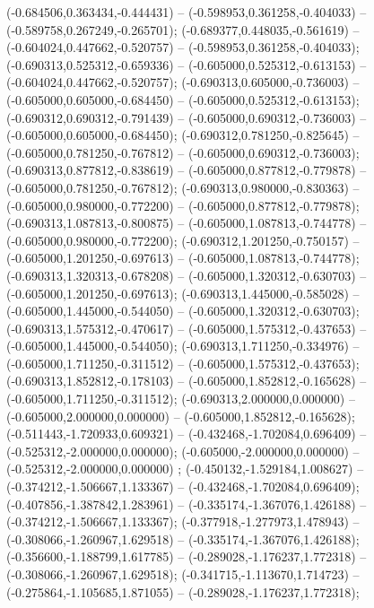  (-0.684506,0.363434,-0.444431) -- (-0.598953,0.361258,-0.404033) -- (-0.589758,0.267249,-0.265701);
 (-0.689377,0.448035,-0.561619) -- (-0.604024,0.447662,-0.520757) -- (-0.598953,0.361258,-0.404033);
 (-0.690313,0.525312,-0.659336) -- (-0.605000,0.525312,-0.613153) -- (-0.604024,0.447662,-0.520757);
 (-0.690313,0.605000,-0.736003) -- (-0.605000,0.605000,-0.684450) -- (-0.605000,0.525312,-0.613153);
 (-0.690312,0.690312,-0.791439) -- (-0.605000,0.690312,-0.736003) -- (-0.605000,0.605000,-0.684450);
 (-0.690312,0.781250,-0.825645) -- (-0.605000,0.781250,-0.767812) -- (-0.605000,0.690312,-0.736003);
 (-0.690313,0.877812,-0.838619) -- (-0.605000,0.877812,-0.779878) -- (-0.605000,0.781250,-0.767812);
 (-0.690313,0.980000,-0.830363) -- (-0.605000,0.980000,-0.772200) -- (-0.605000,0.877812,-0.779878);
 (-0.690313,1.087813,-0.800875) -- (-0.605000,1.087813,-0.744778) -- (-0.605000,0.980000,-0.772200);
 (-0.690312,1.201250,-0.750157) -- (-0.605000,1.201250,-0.697613) -- (-0.605000,1.087813,-0.744778);
 (-0.690313,1.320313,-0.678208) -- (-0.605000,1.320312,-0.630703) -- (-0.605000,1.201250,-0.697613);
 (-0.690313,1.445000,-0.585028) -- (-0.605000,1.445000,-0.544050) -- (-0.605000,1.320312,-0.630703);
 (-0.690313,1.575312,-0.470617) -- (-0.605000,1.575312,-0.437653) -- (-0.605000,1.445000,-0.544050);
 (-0.690313,1.711250,-0.334976) -- (-0.605000,1.711250,-0.311512) -- (-0.605000,1.575312,-0.437653);
 (-0.690313,1.852812,-0.178103) -- (-0.605000,1.852812,-0.165628) -- (-0.605000,1.711250,-0.311512);
 (-0.690313,2.000000,0.000000) -- (-0.605000,2.000000,0.000000) -- (-0.605000,1.852812,-0.165628);
 (-0.511443,-1.720933,0.609321) -- (-0.432468,-1.702084,0.696409) -- (-0.525312,-2.000000,0.000000);
 (-0.605000,-2.000000,0.000000) -- (-0.525312,-2.000000,0.000000) ;
 (-0.450132,-1.529184,1.008627) -- (-0.374212,-1.506667,1.133367) -- (-0.432468,-1.702084,0.696409);
 (-0.407856,-1.387842,1.283961) -- (-0.335174,-1.367076,1.426188) -- (-0.374212,-1.506667,1.133367);
 (-0.377918,-1.277973,1.478943) -- (-0.308066,-1.260967,1.629518) -- (-0.335174,-1.367076,1.426188);
 (-0.356600,-1.188799,1.617785) -- (-0.289028,-1.176237,1.772318) -- (-0.308066,-1.260967,1.629518);
 (-0.341715,-1.113670,1.714723) -- (-0.275864,-1.105685,1.871055) -- (-0.289028,-1.176237,1.772318);
